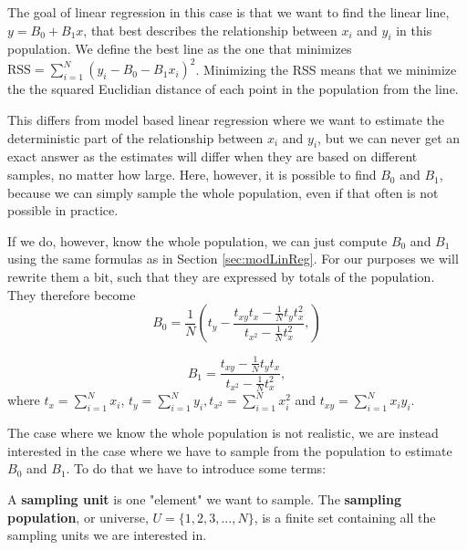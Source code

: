 \documentclass{article}
\begin{document}
The goal of linear regression in this case is that we want to find the linear
line, \(y = B_0 + B_1x\), that best describes the relationship between \(x_i\)
and \(y_i\) in this population. We define the best line as the one
that minimizes \(\mathrm{RSS} = \sum_{i = 1}^N (y_i - B_0 - B_1 x_i)^2\).
Minimizing the RSS means that we minimize the the squared Euclidian distance of each point
in the population from the line.

This differs from model based linear regression where we want to estimate the
deterministic part of the relationship between \(x_i\) and \(y_i\), but we can
never get an exact answer as the estimates will differ when they are based on
different samples, no matter how large. Here, however, it is possible to find \(B_0\) and
\(B_1\), because we can simply sample the whole population, even if that often
is not possible in practice.


If we do, however, know the whole population, we can just compute \(B_0\) and \(B_1\) using the same formulas
as in Section \ref{sec:modLinReg}. For our purposes we will rewrite them a bit,
such that they are expressed by totals of the population. They therefore become
\begin{equation*}
 B_0 = \frac{1}{N} \left( t_y - \frac{t_{xy} t_x - \frac{1}{N} t_y t_x^2}
   {t_{x^2} - \frac{1}{N} t_x^2},
  \right)
\end{equation*}

\begin{equation*}
 B_1 = \frac{t_{xy} - \frac{1}{N} t_y t_x}
   {t_{x^2} - \frac{1}{N} t_x^2},
\end{equation*}
where \(t_x = \sum_{i = 1}^N x_i\), \(t_y = \sum_{i = 1}^N y_i, t_{x^2} =
\sum_{i = 1}^N x_i^2\) and \(t_{xy} =
\sum_{i = 1}^N x_i y_i\).

The case where we know the whole population is not realistic, we are instead interested in the case where we have to sample from the
population to estimate \(B_0\) and \(B_1\). To do that we have to introduce some terms:


\begin{definition} \label{def:sampUnitPop}
 A \textbf{sampling unit} is one "element" we want to sample.
 The \textbf{sampling population}, or universe, \(U = \{1, 2, 3, ..., N\}\), is a
 finite set containing all the sampling units we are interested in.
\end{definition}
\end{document}
